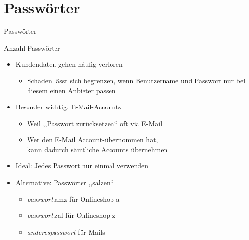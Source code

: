 \section{Passwörter}
  \begin{frame}{Passwörter}


  \end{frame}

  \begin{frame}{Anzahl Passwörter}
    \begin{itemize}
      \item Kundendaten gehen häufig verloren
      \begin{itemize}
        \item Schaden lässt sich begrenzen, wenn Benutzername und Passwort nur bei diesem einen Anbieter passen
      \end{itemize}
      \item Besonder wichtig: E-Mail-Accounts
      \begin{itemize}
        \item Weil ,,Passwort zurücksetzen`` oft via E-Mail
        \item Wer den E-Mail Account-übernommen hat,\\ kann dadurch sämtliche Accounts übernehmen
      \end{itemize}
      \item Ideal: Jedes Passwort nur einmal verwenden
      \item Alternative: Passwörter ,,salzen``
      \begin{itemize}
        \item \textit{passwort}.amz für Onlineshop a
        \item \textit{passwort}.zal für Onlineshop z
        \item \textit{anderespasswort} für Mails
      \end{itemize}
    \end{itemize}
  \end{frame}

